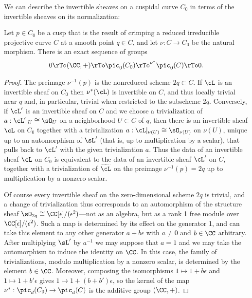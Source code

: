 We can describe the invertible sheaves on a cuspidal curve $C_{0}$ in terms of the invertible sheaves on its
normalization:

\begin{proposition}\label{torsion-free on cuspidal}
Let $p\in C_{0}$ be a cusp that is the result of crimping a reduced irreducible projective curve $C$ at a smooth point $q\in C$,
and let $\nu: C\to C_{0}$ be the natural morphism.
There is an exact sequence of groups
$$
0 \rTo (\CC,+) \rTo \pic_0(C_{0}) \rTo^{\nu^*} \pic_0(C) \rTo 0.
$$
\end{proposition}

\begin{proof}
The preimage $\nu^{-1}(p)$ is the nonreduced scheme $2q \subset C$. If $\cL$ is an invertible sheaf on 
$C_{0}$ then $\nu^{*}(\cL)$ is invertible on $C$, and thus locally trivial near $q$ and, in particular, trivial
when restricted to the subscheme $2q$. Conversely,
if $\cL'$ is an invertible sheaf on $C$ and we choose a trivialization of $a: \cL'|_{U}\cong \sO_{U}$ on a neighborhood $ U\subset C$
of $q$, then there is an invertible sheaf $\cL$ on $C_{0}$ together with a  trivialization
$a: \cL|_{\nu(U)}\cong \sO_{\nu(U)}$
on $\nu(U)$, unique up to an automorphism of $\sL'$ (that is, up to multiplication by a scalar), that
pulls back to $\cL'$ with the given trivialization $a$.
Thus the data of an invertible sheaf $\cL$ on $C_0$ is equivalent to the data of an invertible sheaf $\cL'$ on $C$, together with a trivialization of $\widetilde \cL$ on the preimage $\nu^{-1}(p) = 2q$ up to multiplication by a nonzero scalar.

Of course every invertible sheaf on the zero-dimensional scheme $2q$ is trivial, and a change of trivialization
thus corresponds to an automorphism of the structure sheaf $\sO_{2q} \cong \CC[\epsilon]/(\epsilon^{2})$---not as an algebra, but as a rank 1 free module over $\CC[\epsilon]/(\epsilon^{2})$. Such a map is determined by
its effect on the generator 1, and can take this element to any other generator $a+b\epsilon$ with
$a\neq 0$ and $b\in \CC$ arbitrary. After multiplying $\sL'$ by $a^{-1}$
we may suppose that $a =1$ and we may take the automorphism to induce the identity on $\CC$.
In this case, the family of trivializations, modulo multiplication by a nonzero scalar, is 
determined by the element $b\in \CC$. Moreover, composing the isomorphisms
$1\mapsto 1+b\epsilon$ and $1\mapsto 1+b'\epsilon$  gives $1\mapsto 1+(b+b')\epsilon$,
so the kernel of the map $\nu^{*}: \pic_{d}(C_{0}) \to \pic_{d}(C)$ is 
the additive group $(\CC, +)$.
\end{proof}

